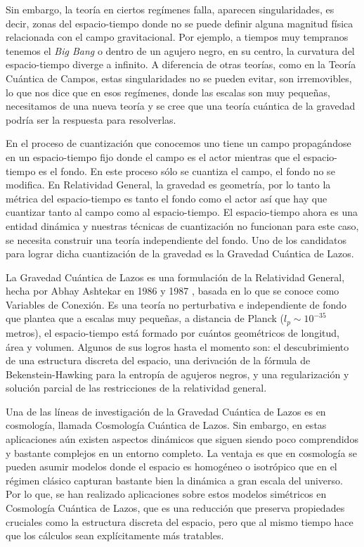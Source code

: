 \documentclass[11pt, letterpaper, spanish]{book}
\theoremstyle{definition}
\theoremstyle{plain}
\theoremstyle{remark}
\theoremstyle{break}
\begin{document}
Sin embargo, la teor\'{i}a en ciertos reg\'{i}menes falla, aparecen singularidades, es decir, zonas del espacio-tiempo donde no se puede definir alguna magnitud f\'{i}sica relacionada con el campo gravitacional. Por ejemplo, a tiempos muy tempranos tenemos el \emph{Big Bang} o dentro de un agujero negro, en su centro, la curvatura del espacio-tiempo diverge a infinito. A diferencia de otras teor\'{i}as, como en la Teor\'{i}a Cu\'{a}ntica de Campos, estas singularidades no se pueden evitar, son irremovibles, lo que nos dice que en esos reg\'{i}menes, donde las escalas son muy peque\~{n}as, necesitamos de una nueva teor\'{i}a y se cree que una teor\'{i}a cu\'{a}ntica de la gravedad podr\'{i}a ser la respuesta para resolverlas.

En el proceso de cuantizaci\'{o}n que conocemos uno tiene un campo propag\'{a}ndose en un espacio-tiempo fijo donde el campo es el actor mientras que el espacio-tiempo es el fondo. En este proceso s\'{o}lo se cuantiza el campo, el fondo no se modifica. En Relatividad General, la gravedad es geometr\'{i}a, por lo tanto la m\'{e}trica del espacio-tiempo es tanto el fondo como el actor as\'{i} que hay que cuantizar tanto al campo como al espacio-tiempo. El espacio-tiempo ahora es una entidad din\'{a}mica y nuestras t\'{e}cnicas de cuantizaci\'{o}n no funcionan para este caso, se necesita construir una teor\'{i}a independiente del fondo. Uno de los candidatos para lograr dicha cuantizaci\'{o}n de la gravedad es la Gravedad Cu\'{a}ntica de Lazos.

La Gravedad Cu\'{a}ntica de Lazos es una formulaci\'{o}n de la Relatividad General, hecha por Abhay Ashtekar en 1986 y 1987 \cite{Ashtekar86, Ashtekar87}, basada en lo que se conoce como Variables de Conexi\'{o}n. Es una teor\'{i}a no perturbativa e independiente de fondo que plantea que a escalas muy peque\~{n}as, a distancia de Planck ($l_{p} \sim 10^{-35}$ metros), el espacio-tiempo est\'{a} formado por cu\'{a}ntos geom\'{e}tricos de longitud, \'{a}rea y volumen. Algunos de sus logros hasta el momento son: el descubrimiento de una estructura discreta del espacio, una derivaci\'{o}n de la f\'{o}rmula de Bekenstein-Hawking para la entrop\'{i}a de agujeros negros, y una regularizaci\'{o}n y soluci\'{o}n parcial de las restricciones de la relatividad general. 

Una de las l\'{i}neas de investigaci\'{o}n de la Gravedad Cu\'{a}ntica de Lazos es en cosmolog\'{i}a, llamada Cosmolog\'{i}a Cu\'{a}ntica de Lazos. Sin embargo, en estas aplicaciones a\'{u}n existen aspectos din\'{a}micos que siguen siendo poco comprendidos y bastante complejos en un entorno completo. La ventaja es que en cosmolog\'{i}a se pueden asumir modelos donde el espacio es homog\'{e}neo o isotr\'{o}pico que en el r\'{e}gimen cl\'{a}sico capturan bastante bien la din\'{a}mica a gran escala del universo. Por lo que, se han realizado aplicaciones sobre estos modelos sim\'{e}tricos en Cosmolog\'{i}a Cu\'{a}ntica de Lazos, que es una reducci\'{o}n que preserva propiedades cruciales como la estructura discreta del espacio, pero que al mismo tiempo hace que los c\'{a}lculos sean expl\'{i}citamente m\'{a}s tratables.
\end{document}
